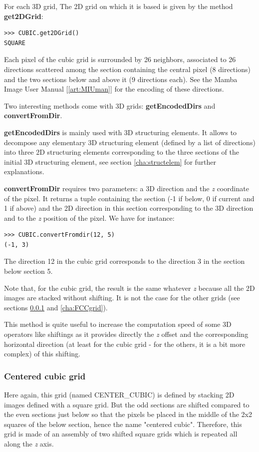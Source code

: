 \documentclass[a4paper,10pt,oneside]{article}
\begin{document}
For each 3D grid, The 2D grid on which it is based is given by the method \textbf{get2DGrid}:

\lstset{language=Python}
\begin{lstlisting}
>>> CUBIC.get2DGrid()
SQUARE
\end{lstlisting}

Each pixel of the cubic grid is surrounded by 26 neighbors, associated to 26 directions scattered among the section containing the
central pixel (8 directions) and the two sections below and above it (9 directions each). See the Mamba Image User Manual [\ref{art:MIUman}]
for the encoding of these directions.

Two interesting methods come with 3D grids: \textbf{getEncodedDirs} and \textbf{convertFromDir}.

\textbf{getEncodedDirs} is mainly used with 3D structuring elements. It allows to decompose any elementary 3D structuring element (defined
by a list of directions) into three 2D structuring elements corresponding to the three sections of the initial 3D structuring
element, see section \ref{cha:structelem} for further explanations.

\textbf{convertFromDir} requires two parameters: a 3D direction and the \emph{z} coordinate of the pixel. It returns a tuple containing the section
(-1 if below, 0 if current and 1 if above) and the 2D direction in this section corresponding to the 3D direction and to the \emph{z} position of the
pixel. We have for instance:

\lstset{language=Python}
\begin{lstlisting}
>>> CUBIC.convertFromdir(12, 5)
(-1, 3)
\end{lstlisting}

The direction 12 in the cubic grid corresponds to the direction 3 in the section below section 5.

Note that, for the cubic grid, the result is the same whatever \emph{z} because all the 2D images are stacked without shifting. It is
not the case for the other grids (see sections \ref{cha:CCgrid} and \ref{cha:FCCgrid}).

This method is quite useful to increase the computation speed of some 3D operators like shiftings as it provides directly
the \emph{z} offset and the corresponding horizontal direction (at least for the cubic grid - for the others, it is a bit more complex)
of this shifting.

\subsubsection{Centered cubic grid}
\label{cha:CCgrid}
Here again, this grid (named CENTER\_CUBIC) is defined by stacking 2D images defined with a square grid. But the odd sections
are shifted compared to the even sections just below so that the pixels be placed in the middle of the 2x2 squares of the below
section, hence the name "centered cubic". Therefore, this grid is made of an assembly of two shifted square grids which is
repeated all along the \emph{z} axis.
\end{document}
